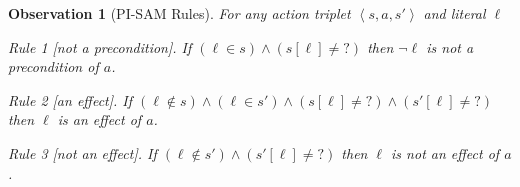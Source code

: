 \documentclass[letterpaper]{article} %
\newcommand{\tuple}[1]{\ensuremath{\left \langle #1 \right \rangle }}
\newcommand{\pre}{\textit{pre}}
\newcommand{\eff}{\textit{eff}}
\newcommand{\true}{\textit{true}}
\newcommand{\false}{\textit{false}}
\newcommand{\unobserved}{\textit{?}}
\newtheorem{observation}[theorem]{Observation}
\begin{document}
\begin{observation}[PI-SAM Rules]\label{obs:pi-sam-learning-rules}
For any action triplet $\tuple{s, a, s'}$ and literal $\ell$%
\begin{compactitem}
    \item[Rule 1][not a precondition]. If $\left(\ell\in s\right)\wedge
    \left(s[\ell]\neq\unobserved\right)$
    then $\neg \ell$ is not a precondition of $a$.
    \item[Rule 2][an effect]. If
    $\left(\ell\notin s\right)\wedge
     \left(\ell\in s'\right)\wedge
    \left(s[\ell]\neq\unobserved\right)\wedge
     \left(s'[\ell]\neq\unobserved\right)$ then $\ell$ is an effect of $a$.
    \item[Rule 3][not an effect]. If
    $\left(\ell\notin s'\right)\wedge
    \left(s'[\ell]\neq\unobserved\right)$ then $\ell$ is not an effect of $a$.







\end{compactitem}
\end{observation}
\end{document}
